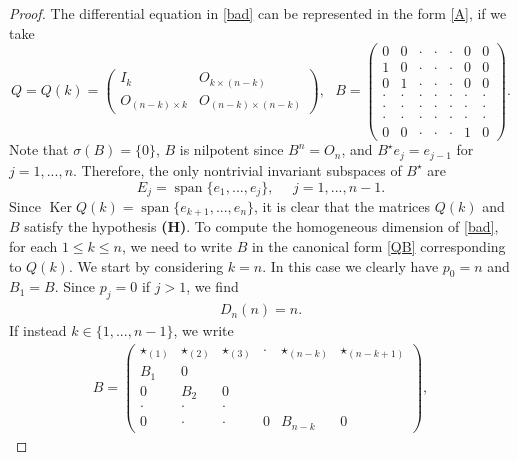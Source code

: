 \documentclass[11pt,letter]{amsart}
\def \O {\Omega}
\numberwithin{equation}{section}
\numberwithin{equation}{section}
\begin{document}
\begin{proof}
The differential equation in \eqref{bad} can be represented in the form \eqref{A}, if we take
\begin{equation}\label{QkB}
Q = Q(k) = \begin{pmatrix} I_{k} & O_{k\times (n-k)}\\O_{(n-k)\times k} & O_{(n-k)\times(n-k)}\end{pmatrix},\ \ \ B = \begin{pmatrix} 0 & 0 & \cdot & \cdot & \cdot & 0 & 0
\\
1 & 0 & \cdot & \cdot & \cdot & 0 & 0
\\
0 & 1 & \cdot & \cdot & \cdot &  0 & 0
\\
\cdot & \cdot & \cdot & \cdot & \cdot & \cdot & \cdot
\\
\cdot & \cdot & \cdot & \cdot & \cdot & \cdot & \cdot
\\
\cdot & \cdot & \cdot & \cdot & \cdot & \cdot & \cdot
\\
0 & 0 & \cdot & \cdot & \cdot &  1 & 0
\end{pmatrix}.
\end{equation}
Note that $\sigma(B) = \{0\}$, $B$ is nilpotent since $B^n = O_n$, and $B^\star e_j = e_{j-1}$ for $j=1,...,n$. Therefore, the only nontrivial invariant subspaces of $B^\star$ are
\[
E_j = \operatorname{span}\{e_1,...,e_j\},\ \ \ \ \ \ j=1,...,n-1.
\]
Since $\operatorname{Ker} Q(k) = \operatorname{span}\{e_{k+1},...,e_n\}$, it is clear that the matrices $Q(k)$ and $B$ satisfy the hypothesis \textbf{(H)}. To compute the homogeneous dimension of \eqref{bad}, for each $1\le k\le n$, we need to write $B$ in the canonical form \eqref{QB} corresponding to $Q(k)$. We start by considering $k=n$. In this case we clearly have $p_{0}=n$ and $B_{1}=B$. Since $p_{j}=0$ if $j>1$, we find
\begin{align*}
D_{n}(n)=n.
\end{align*}
If instead $k\in\{1,...,n-1\}$, we write
\begin{align}\label{Bbad}
B=\begin{pmatrix}
\star_{(1)} & \star_{(2)} & \star_{(3)} & \cdot &\star_{(n-k)} &  \star_{(n-k+1)} \\
B_{1} & 0 &  \\
0 & B_{2} & 0 \\
\cdot & \cdot & \cdot \\
0 & \cdot & \cdot &  0 & B_{n-k} & 0
\end{pmatrix},
\end{align}

\end{proof}
\end{document}

